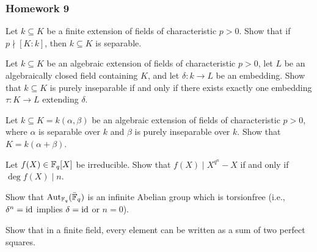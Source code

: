 \subsubsection{Homework 9}
\setcounter{exercise}{0}

\begin{problem}
  Let $k\subseteq K$ be a finite extension of fields of characteristic
  $p>0$. Show that if $p\nmid[K:k]$, then $k\subseteq K$ is separable.
\end{problem}
\begin{solution}
\end{solution}

\begin{problem}
  Let $k\subseteq K$ be an algebraic extension of fields of characteristic
  $p>0$, let $L$ be an algebraically closed field containing $K$, and let
  $\delta\colon k\to L$ be an embedding. Show that $k\subseteq K$ is purely
  inseparable if and only if there exists exactly one embedding
  $\tau\colon K\to L$ extending $\delta$.
\end{problem}
\begin{solution}
\end{solution}

\begin{problem}
  Let $k\subseteq K=k(\alpha,\beta)$ be an algebraic extension of fields of
  characteristic $p>0$, where $\alpha$ is separable over $k$ and $\beta$ is
  purely inseparable over $k$. Show that $K=k(\alpha+\beta)$.
\end{problem}
\begin{solution}
\end{solution}

\begin{problem}
  Let $f(X)\in\mathbb{F}_q[X]$ be irreducible. Show that $f(X)\mid X^{q^n}-X$ if
  and only if $\deg f(X)\mid n$.
\end{problem}
\begin{solution}
\end{solution}

\begin{problem}
  Show that $\operatorname{Aut}_{\mathbb{F}_q}(\bar{\mathbb{F}}_q)$ is an infinite Abelian group which
  is torsionfree (i.e., $\delta^n=\operatorname{id}$ implies $\delta=\operatorname{id}$ or $n=0$).
\end{problem}
\begin{solution}
\end{solution}

\begin{problem}
  Show that in a finite field, every element can be written as a sum of two
  perfect squares.
\end{problem}
\begin{solution}
\end{solution}

